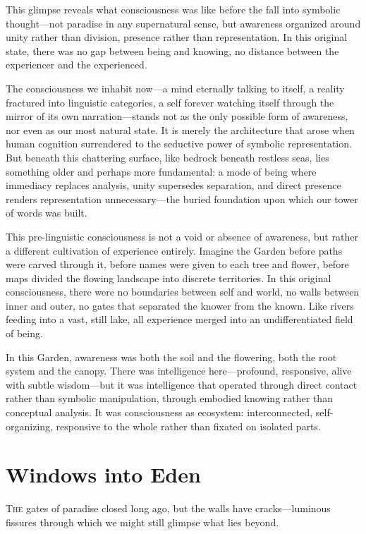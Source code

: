 This glimpse reveals what consciousness was like before the fall into symbolic thought—not paradise in any supernatural sense, but awareness organized around unity rather than division, presence rather than representation. In this original state, there was no gap between being and knowing, no distance between the experiencer and the experienced.

The consciousness we inhabit now—a mind eternally talking to itself, a reality fractured into linguistic categories, a self forever watching itself through the mirror of its own narration—stands not as the only possible form of awareness, nor even as our most natural state. It is merely the architecture that arose when human cognition surrendered to the seductive power of symbolic representation. But beneath this chattering surface, like bedrock beneath restless seas, lies something older and perhaps more fundamental: a mode of being where immediacy replaces analysis, unity supersedes separation, and direct presence renders representation unnecessary—the buried foundation upon which our tower of words was built.

This pre-linguistic consciousness is not a void or absence of awareness, but rather a different cultivation of experience entirely. Imagine the Garden before paths were carved through it, before names were given to each tree and flower, before maps divided the flowing landscape into discrete territories. In this original consciousness, there were no boundaries between self and world, no walls between inner and outer, no gates that separated the knower from the known. Like rivers feeding into a vast, still lake, all experience merged into an undifferentiated field of being.

In this Garden, awareness was both the soil and the flowering, both the root system and the canopy. There was intelligence here—profound, responsive, alive with subtle wisdom—but it was intelligence that operated through direct contact rather than symbolic manipulation, through embodied knowing rather than conceptual analysis. It was consciousness as ecosystem: interconnected, self-organizing, responsive to the whole rather than fixated on isolated parts.

\section{Windows into Eden}

\lettrine{T}{he} gates of paradise closed long ago, but the walls have cracks—luminous fissures through which we might still glimpse what lies beyond.

